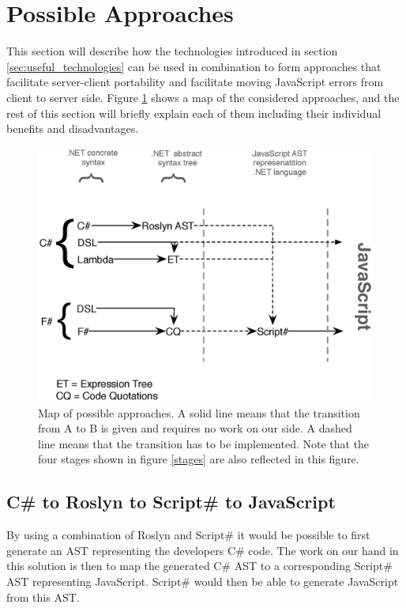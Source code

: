 \section{Possible Approaches} %
\label{sec:possible_approaches}
	This section will describe how the technologies introduced in section \ref{sec:useful_technologies} can be used in combination to form approaches that facilitate server-client portability and facilitate moving JavaScript errors from client to server side. Figure \ref{approachMap} shows a map of the considered approaches, and the rest of this section will briefly explain each of them including their individual benefits and disadvantages. 

	\begin{figure}[H]
		\begin{center}
			\centerline{\includegraphics[width=14cm]{resources/images/approachComparison.eps}}
		\end{center}
		\caption{Map of possible approaches. A solid line means that the transition from A to B is given and requires no work on our side. A dashed line means that the transition has to be implemented. Note that the four stages shown in figure \ref{stages} are also reflected in this figure.}
		\label{approachMap}
	\end{figure}

		
	\subsection{C\# to Roslyn to Script\# to JavaScript} %
	\label{ssub:c_to_roslyn_to_script_to_javascript}
		By using a combination of Roslyn and Script\# it would be possible to first generate an AST representing the developers C\# code. The work on our hand in this solution is then to map the generated C\# AST to a corresponding Script\# AST representing JavaScript. Script\# would then be able to generate JavaScript from this AST.

